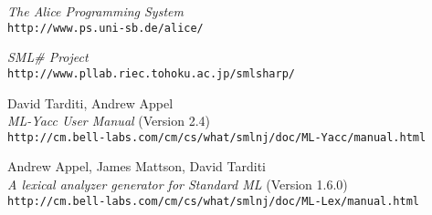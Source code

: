 \documentclass[twoside,titlepage]{article}
\begin{document}
\begin{appendix}
\begin{thebibliography}{MTHM97}
{\it The Alice Programming System} \\
{\small\tt{http://www.ps.uni-sb.de/alice/}}

{\it SML\# Project} \\
{\small\tt{http://www.pllab.riec.tohoku.ac.jp/smlsharp/}}

David Tarditi, Andrew Appel \\
{\it ML-Yacc User Manual} (Version 2.4) \\
{\small\tt{http://cm.bell-labs.com/cm/cs/what/smlnj/doc/ML-Yacc/manual.html}}

Andrew Appel, James Mattson, David Tarditi \\
{\it A lexical analyzer generator for Standard ML} (Version 1.6.0) \\
{\small\tt{http://cm.bell-labs.com/cm/cs/what/smlnj/doc/ML-Lex/manual.html}}

\end{thebibliography}


\end{appendix}

\end{document}
